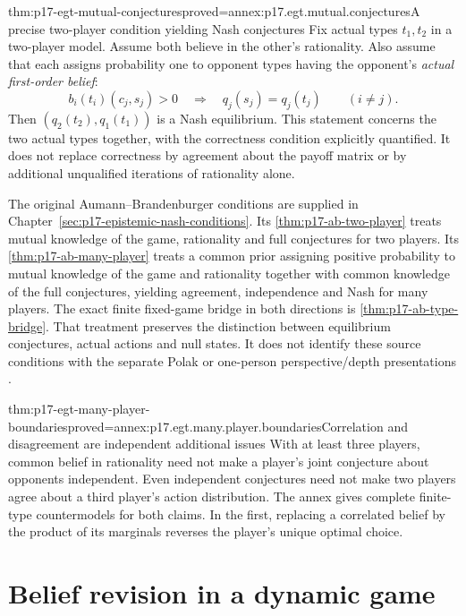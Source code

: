 \begin{hbtheorem}{thm:p17-egt-mutual-conjectures}{proved=annex:p17.egt.mutual.conjectures}{A precise two-player condition yielding Nash conjectures}
Fix actual types \(t_1,t_2\) in a two-player model. Assume both
believe in the other's rationality. Also assume that each assigns
probability one to opponent types having the opponent's
\emph{actual first-order belief}:
\[
 b_i(t_i)(c_j,s_j)>0\quad\Longrightarrow\quad
                 q_j(s_j)=q_j(t_j)\qquad(i\ne j).
\]
Then \((q_2(t_2),q_1(t_1))\) is a Nash equilibrium.
This statement concerns the two actual types together, with the
correctness condition explicitly quantified. It does not replace
correctness by agreement about the payoff matrix or by additional
unqualified iterations of rationality alone.
\end{hbtheorem}

The original Aumann--Brandenburger conditions are supplied in
Chapter~\ref{sec:p17-epistemic-nash-conditions}.
Its \cref{thm:p17-ab-two-player} treats mutual knowledge of the
game, rationality and full conjectures for two players.
Its \cref{thm:p17-ab-many-player} treats a common prior assigning
positive probability to mutual knowledge of the game and rationality
together with common knowledge of the full conjectures, yielding
agreement, independence and Nash for many players.
The exact finite fixed-game bridge in both directions is
\cref{thm:p17-ab-type-bridge}. That treatment preserves the
distinction between equilibrium conjectures, actual actions
and null states. It does not identify these source conditions
with the separate Polak or one-person perspective/depth
presentations \cite{AumannBrandenburger1995Epistemic}.

\begin{hbtheorem}{thm:p17-egt-many-player-boundaries}{proved=annex:p17.egt.many.player.boundaries}{Correlation and disagreement are independent additional issues}
With at least three players, common belief in rationality need
not make a player's joint conjecture about opponents independent.
Even independent conjectures need not make two players agree
about a third player's action distribution.
The annex gives complete finite-type countermodels for both claims.
In the first, replacing a correlated belief by the product of its
marginals reverses the player's unique optimal choice.
\end{hbtheorem}

\section{Belief revision in a dynamic game}

